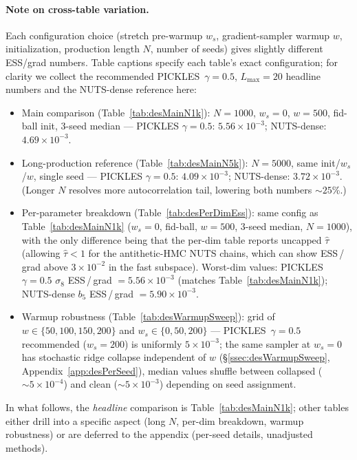 \documentclass{article}
\begin{document}
\paragraph{Note on cross-table variation.}
Each configuration choice (stretch pre-warmup $w_s$, gradient-sampler
warmup $w$, initialization, production length $N$, number of seeds)
gives slightly different ESS/grad numbers.  Table captions specify each
table's exact configuration; for clarity we collect the recommended
PICKLES~$\gamma{=}0.5$, $L_{\max}{=}20$ headline numbers and the
NUTS-dense reference here:
\begin{itemize}\setlength\itemsep{1pt}
\item Main comparison (Table~\ref{tab:desMainN1k}): $N{=}1000$,
$w_s{=}0$, $w{=}500$, fid-ball init, $3$-seed median ---
PICKLES $\gamma=0.5$: $5.56\!\times\!10^{-3}$; NUTS-dense:
$4.69\!\times\!10^{-3}$.
\item Long-production reference (Table~\ref{tab:desMainN5k}):
$N{=}5000$, same init/$w_s$/$w$, single seed ---
PICKLES $\gamma=0.5$: $4.09\!\times\!10^{-3}$; NUTS-dense:
$3.72\!\times\!10^{-3}$.  (Longer $N$ resolves more autocorrelation
tail, lowering both numbers $\sim\!25$\%.)
\item Per-parameter breakdown
(Table~\ref{tab:desPerDimEss}): same config as
Table~\ref{tab:desMainN1k} ($w_s{=}0$, fid-ball, $w{=}500$, $3$-seed
median, $N{=}1000$), with the only difference being that the per-dim
table reports uncapped $\hat\tau$ (allowing $\hat\tau < 1$ for the
antithetic-HMC NUTS chains, which can show ESS\,/\,grad above
$3\!\times\!10^{-2}$ in the fast subspace). Worst-dim values:
PICKLES $\gamma=0.5$ $\sigma_8$ ESS\,/\,grad $= 5.56\!\times\!10^{-3}$
(matches Table~\ref{tab:desMainN1k}); NUTS-dense $b_5$ ESS\,/\,grad
$= 5.90\!\times\!10^{-3}$.
\item Warmup robustness (Table~\ref{tab:desWarmupSweep}): grid of
$w \in \{50, 100, 150, 200\}$ and $w_s \in \{0, 50, 200\}$ ---
PICKLES~$\gamma=0.5$ recommended ($w_s{=}200$) is uniformly
$5\!\times\!10^{-3}$; the same sampler at $w_s{=}0$ has stochastic
ridge collapse independent of $w$ (\S\ref{ssec:desWarmupSweep},
Appendix~\ref{app:desPerSeed}), median values shuffle between
collapsed ($\sim\!5\!\times\!10^{-4}$) and clean
($\sim\!5\!\times\!10^{-3}$) depending on seed assignment.
\end{itemize}

In what follows, the \emph{headline} comparison is
Table~\ref{tab:desMainN1k}; other tables either drill into a specific
aspect (long $N$, per-dim breakdown, warmup robustness) or are deferred
to the appendix (per-seed details, unadjusted methods).
\end{document}
